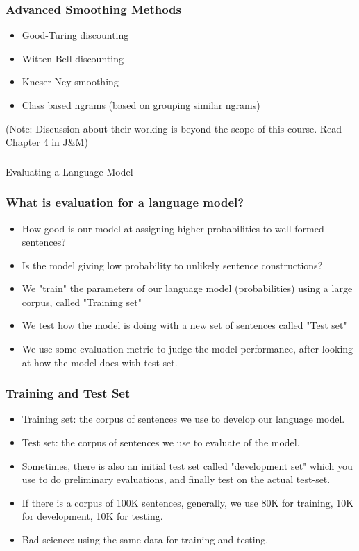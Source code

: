 \documentclass{beamer}
\begin{document}
\begin{frame}
\frametitle{Advanced Smoothing Methods}
\begin{itemize}
\item Good-Turing discounting
\item Witten-Bell discounting
\item Kneser-Ney smoothing
\item Class based ngrams (based on grouping similar ngrams)
\end{itemize}
(Note: Discussion about their working is beyond the scope of this course. Read Chapter 4 in J\&M)
\end{frame}

\begin{frame}
\frametitle{}
\begin{center}
\Large Evaluating a Language Model
\end{center}
\end{frame}

\begin{frame}
\frametitle{What is evaluation for a language model?}
\begin{itemize}
\item How good is our model at assigning higher probabilities to well formed sentences?
\item Is the model giving low probability to unlikely sentence constructions?
\item We "train" the parameters of our language model (probabilities) using a large corpus, called "Training set"
\item We test how the model is doing with a new set of sentences called "Test set"
\item We use some evaluation metric to judge the model performance, after looking at how the model does with test set.
\end{itemize}
\end{frame}

\begin{frame}
\frametitle{Training and Test Set}
\begin{itemize}
\item Training set: the corpus of sentences we use to develop our language model.
\item Test set: the corpus of sentences we use to evaluate of the model.
\item Sometimes, there is also an initial test set called "development set" which you use to do preliminary evaluations, and finally test on the actual test-set.
\item If there is a corpus of 100K sentences, generally, we use 80K for training, 10K for development, 10K for testing.
\item Bad science: using the same data for training and testing. 
\end{itemize}
\end{frame}
\end{document}
